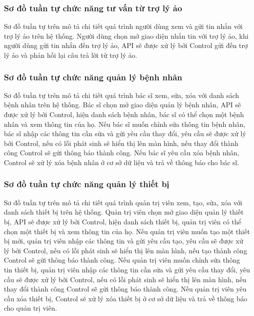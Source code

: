 \subsubsection{Sơ đồ tuần tự chức năng tư vấn từ trợ lý ảo}

Sơ đồ tuần tự trên mô tả chi tiết quá trình người dùng xem và gửi tin nhắn với trợ lý ảo trên hệ thống. Người dùng chọn mở giao diện nhắn tin với trợ lý ảo, 
khi người dùng gửi tin nhắn đến trợ lý ảo, API sẽ được xử lý bởi Control gửi đến trợ lý ảo và phản hồi lại câu trả lời từ trợ lý ảo.


\subsubsection{Sơ đồ tuần tự chức năng quản lý bệnh nhân}

Sơ đồ tuần tự trên mô tả chi tiết quá trình bác sĩ xem, sửa, xóa với danh sách bệnh nhân trên hệ thống. Bác sĩ chọn mở giao diện quản lý bệnh nhân, 
API sẽ được xử lý bởi Control, hiện danh sách bệnh nhân, bác sĩ có thể chọn một bệnh nhân và xem thông tin của họ. Nếu bác sĩ muốn chỉnh sửa thông tin
bệnh nhân, bác sĩ nhập các thông tin cần sửa và gửi yêu cầu thay đổi, yêu cầu sẽ được xử lý bởi Control, nếu có lỗi phát sinh sẽ hiển thị lên màn hình, nếu 
thay đổi thành công Control sẽ gửi thông báo thành công. Nếu bác sĩ yêu cầu xóa bệnh nhân, Control sẽ xử lý xóa bệnh nhân ở cơ sở dữ liệu và trả về thông báo
cho bác sĩ.  


\subsubsection{Sơ đồ tuần tự chức năng quản lý thiết bị}

Sơ đồ tuần tự trên mô tả chi tiết quá trình quản trị viên xem, tạo, sửa, xóa với danh sách thiết bị trên hệ thống. Quản trị viên chọn mở giao diện quản lý thiết bị, 
API sẽ được xử lý bởi Control, hiện danh sách thiết bị, quản trị viên có thể chọn một thiết bị và xem thông tin của họ. Nếu quản trị viên muốn tạo một thiết bị mới,
quản trị viên nhập các thông tin và gửi yêu cầu tạo, yêu cầu sẽ được xử lý bởi Control, nếu có lỗi phát sinh sẽ hiển thị lên màn hình, nếu tạo thành công Control 
sẽ gửi thông báo thành công. Nếu quản trị viên muốn chỉnh sửa thông tin thiết bị, quản trị viên nhập các thông tin cần sửa và gửi yêu cầu thay đổi, yêu cầu sẽ được xử lý
bởi Control, nếu có lỗi phát sinh sẽ hiển thị lên màn hình, nếu thay đổi thành công Control sẽ gửi thông báo thành công. Nếu quản trị viên yêu cầu xóa thiết bị, Control 
sẽ xử lý xóa thiết bị ở cơ sở dữ liệu và trả về thông báo cho quản trị viên.

